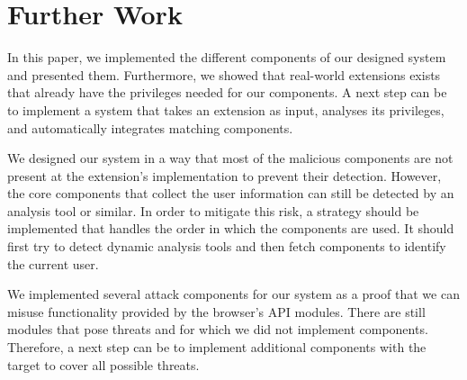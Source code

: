 
\chapter{Further Work}
\label{chp:furhterWork}

	In this paper, we implemented the different components of our designed system and presented them. Furthermore, we showed that real-world extensions exists that already have the privileges needed for our components. A next step can be to implement a system that takes an extension as input, analyses its privileges, and automatically integrates matching components. 

	We designed our system in a way that most of the malicious components are not present at the extension's implementation to prevent their detection. However, the core components that collect the user information can still be detected by an analysis tool or similar. In order to mitigate this risk, a strategy should be implemented that handles the order in which the components are used. It should first try to detect dynamic analysis tools and then fetch components to identify the current user.
	
	We implemented several attack components for our system as a proof that we can misuse functionality provided by the browser's API modules. There are still modules that pose threats and for which we did not implement components. Therefore, a next step can be to implement additional components with the target to cover all possible threats. 